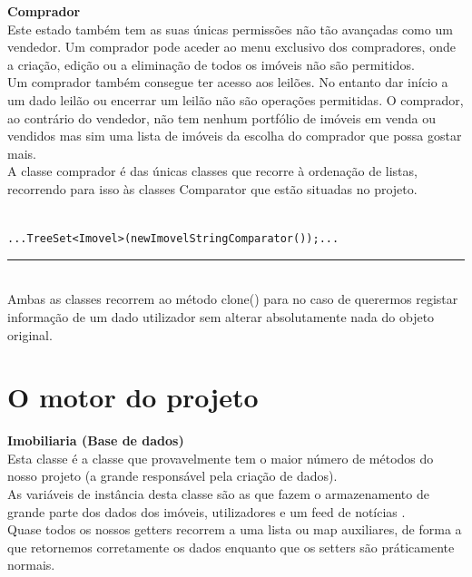 \documentclass[12pt]{article}
\newenvironment{code}                    
{\textbf{
} \hspace{1cm} \hrulefill \\ 
\smallskip 
\begin{center}
\begin{minipage}{0.9\textwidth} 
\begin{alltt}\small}
{\end{alltt}
\end{minipage}
\end{center}
\hrule\smallskip
}
\begin{document}
\textbf{Comprador}
~\\
Este estado também tem as suas únicas permissões não tão avançadas como um vendedor. Um comprador pode aceder ao menu exclusivo dos compradores, 
onde a criação, edição ou a eliminação de todos os imóveis não são permitidos.
\\
Um comprador também consegue ter acesso aos leilões. No entanto dar início a um dado leilão ou encerrar um leilão não são operações permitidas.
O comprador, ao contrário do vendedor, não tem nenhum portfólio de imóveis em venda ou vendidos mas sim uma lista de imóveis da escolha do comprador que possa gostar mais.
\\
A classe comprador é das únicas classes que recorre à ordenação de listas, recorrendo para isso às classes Comparator que estão situadas no projeto.
~\\
\newline
\begin{code}
... TreeSet <Imovel> (new ImovelStringComparator ()); ...
\end{code}
~\\
Ambas as classes recorrem ao método clone() para no caso de querermos registar informação de um dado utilizador sem alterar absolutamente nada do objeto original.


\pagebreak

\section{O motor do projeto}

\textbf{Imobiliaria (Base de dados)}
\\

Esta classe é a classe que provavelmente tem o maior número de métodos do nosso projeto (a grande responsável pela criação de dados).
\\
As variáveis de instância desta classe são as que fazem o armazenamento de grande parte dos dados dos imóveis, utilizadores e um feed de notícias . 
\\

Quase todos os nossos getters recorrem a uma lista ou map auxiliares, de forma a que retornemos corretamente os dados enquanto que os setters são práticamente normais.
\\
\end{document}
